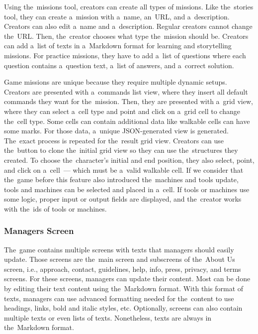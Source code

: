 Using the~missions tool, creators can create all types of missions.
Like the~stories tool, they can create a~mission with a~name, an~URL, and a~description.
Creators can also edit a~name and a~description.
Regular creators cannot change the~URL.
Then, the~creator chooses what type the~mission should be.
Creators can add a~list of texts in a~Markdown format for learning and storytelling missions.
For practice missions, they have to add a~list of questions where each question contains a~question text, a~list of answers, and a~correct solution.  

Game missions are unique because they require multiple dynamic setups.
Creators are presented with a~commands list view, where they insert all default commands they want for the~mission.
Then, they are presented with a~grid view, where they can select a~cell type and point and click on a~grid cell to change the~cell type.
Some cells can contain additional data like walkable cells can have some marks.
For those data, a~unique JSON-generated view is generated.
The~exact process is repeated for the~result grid view.
Creators can use the~button to clone the~initial grid view so they can use the~structures they created.
To choose the~character's initial and end position, they also select, point, and click on a~cell~--- which must be a~valid walkable cell.
If we consider that the~game before this feature also introduced the~machines and tools update, tools and machines can be selected and placed in a~cell.
If tools or machines use some logic, proper input or output fields are displayed, and the~creator works with the~ids of tools or machines.

\subsubsection{Managers Screen}

The~game contains multiple screens with texts that managers should \mbox{easily} update.
Those screens are the~main screen and subscreens of the~About Us screen, i.e., approach, contact, guidelines, help, info, press, privacy, and terms screens.
For these screens, managers can update their content.
Most can be done by editing their text content using the~Markdown format.
With this format of texts, managers can use advanced formatting needed for the~content to use headings, links, bold and italic styles, etc.
Optionally, screens can also contain multiple texts or even lists of texts.
Nonetheless, texts are always in the~Markdown format.

